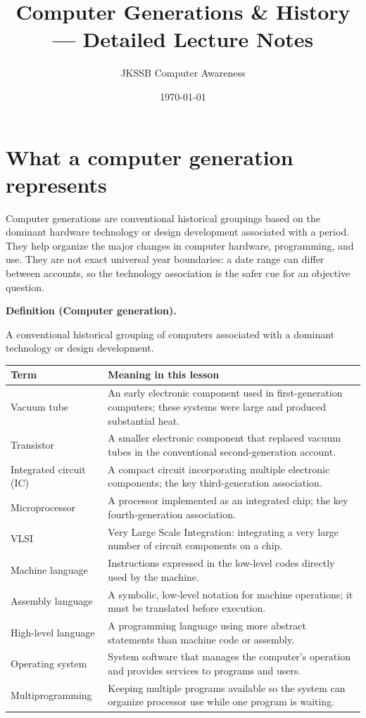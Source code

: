 \documentclass[11pt]{article}
\title{Computer Generations \& History --- Detailed Lecture Notes}
\author{JKSSB Computer Awareness}
\date{\today}
\newenvironment{definitionbox}[1]{%
  \par\noindent\textbf{Definition (#1).}\ \itshape
}{\par\vspace{0.3em}}
\begin{document}
\maketitle

\section{What a computer generation represents}
Computer generations are conventional historical groupings based on the
dominant hardware technology or design development associated with a period.
They help organize the major changes in computer hardware, programming, and
use. They are not exact universal year boundaries: a date range can differ
between accounts, so the technology association is the safer cue for an
objective question.

\begin{definitionbox}{Computer generation}
A conventional historical grouping of computers associated with a dominant
technology or design development.
\end{definitionbox}

\begin{center}
\begin{tabular}{p{}p{}}
\toprule
\textbf{Term} & \textbf{Meaning in this lesson}\\
\midrule
Vacuum tube & An early electronic component used in first-generation computers; these systems were large and produced substantial heat.\\
Transistor & A smaller electronic component that replaced vacuum tubes in the conventional second-generation account.\\
Integrated circuit (IC) & A compact circuit incorporating multiple electronic components; the key third-generation association.\\
Microprocessor & A processor implemented as an integrated chip; the key fourth-generation association.\\
VLSI & Very Large Scale Integration: integrating a very large number of circuit components on a chip.\\
Machine language & Instructions expressed in the low-level codes directly used by the machine.\\
Assembly language & A symbolic, low-level notation for machine operations; it must be translated before execution.\\
High-level language & A programming language using more abstract statements than machine code or assembly.\\
Operating system & System software that manages the computer's operation and provides services to programs and users.\\
Multiprogramming & Keeping multiple programs available so the system can organize processor use while one program is waiting.\\
\bottomrule
\end{tabular}
\end{center}
\end{document}
